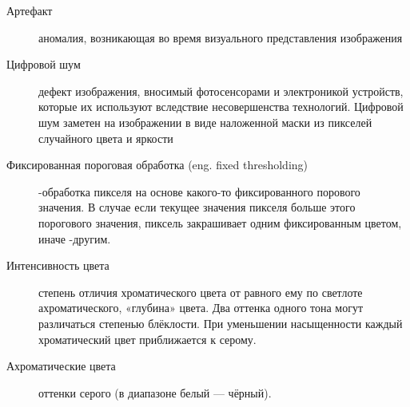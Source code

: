 \Defines %
\begin{description}
\item[Артефакт] 
 аномалия, возникающая во время визуального представления изображения\cite{Wiki}
\item[Цифровой шум] дефект изображения, вносимый фотосенсорами и электроникой устройств, которые их используют вследствие несовершенства технологий.
Цифровой шум заметен на изображении в виде наложенной маски из пикселей случайного цвета и яркости\cite{Wiki}

\item[Фиксированная пороговая обработка (eng. fixed thresholding)] -обработка пикселя на основе какого-то фиксированного порового значения. В случае если текущее значения пикселя больше этого порогового значения, пиксель закрашивает одним фиксированным цветом, иначе -другим. 
\cite{Dh}
\item[Интенсивность цвета]  степень отличия хроматического цвета от равного ему по светлоте ахроматического, «глубина» цвета. Два оттенка одного тона могут различаться степенью блёклости. При уменьшении насыщенности каждый хроматический цвет приближается к серому.\cite{Wiki}
\item[Ахроматические цвета] оттенки серого (в диапазоне белый — чёрный).\cite{Wiki}




\end{description}

